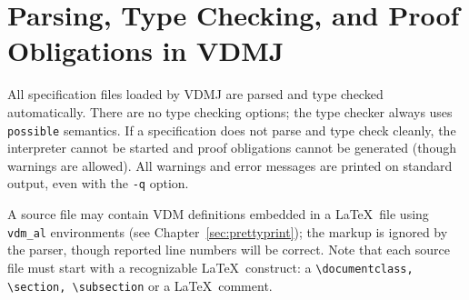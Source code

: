 \documentclass{overturerepchap}
\begin{document}



\section{Parsing, Type Checking, and Proof Obligations in VDMJ}

All specification files loaded by VDMJ are parsed and type checked
automatically. There are no type checking options; the type checker
always uses \texttt{possible} semantics. If a specification does not parse
and type check cleanly, the interpreter cannot be started and proof
obligations cannot be generated (though warnings are allowed). All
warnings and error messages are printed on standard output, even
with the \texttt{-q} option.

A source file may contain VDM definitions embedded
in a \LaTeX\ file using \verb|vdm_al| environments (see
Chapter~\ref{sec:prettyprint}); the markup is ignored by the parser,
though reported line numbers will be correct. Note that each source file
must start with a recognizable \LaTeX\ construct:
a \verb+\documentclass, \section, \subsection+ or a \LaTeX\ comment.
\end{document}
